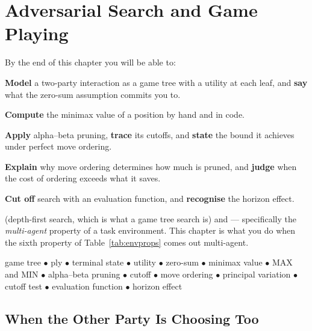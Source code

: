 \chapter{Adversarial Search and Game Playing}\label{ch:adversarial}

\begin{outcomes}
By the end of this chapter you will be able to:
\begin{tight}
  \item \textbf{Model} a two-party interaction as a game tree with a utility at
        each leaf, and \textbf{say} what the zero-sum assumption commits you to.
  \item \textbf{Compute} the minimax value of a position by hand and in code.
  \item \textbf{Apply} alpha--beta pruning, \textbf{trace} its cutoffs, and
        \textbf{state} the bound it achieves under perfect move ordering.
  \item \textbf{Explain} why move ordering determines how much is pruned, and
        \textbf{judge} when the cost of ordering exceeds what it saves.
  \item \textbf{Cut off} search with an evaluation function, and \textbf{recognise}
        the horizon effect.
\end{tight}
\end{outcomes}

\begin{prereq}
 (depth-first search, which is what a game tree search is) and
 --- specifically the \emph{multi-agent} property of a task
environment. This chapter is what you do when the sixth property of
Table~\ref{tab:envprops} comes out multi-agent.
\end{prereq}

\begin{keyterms}
game tree $\bullet$ ply $\bullet$ terminal state $\bullet$ utility $\bullet$
zero-sum $\bullet$ minimax value $\bullet$ MAX and MIN $\bullet$ alpha--beta
pruning $\bullet$ cutoff $\bullet$ move ordering $\bullet$ principal variation
$\bullet$ cutoff test $\bullet$ evaluation function $\bullet$ horizon effect
\end{keyterms}

\section{When the Other Party Is Choosing Too}


